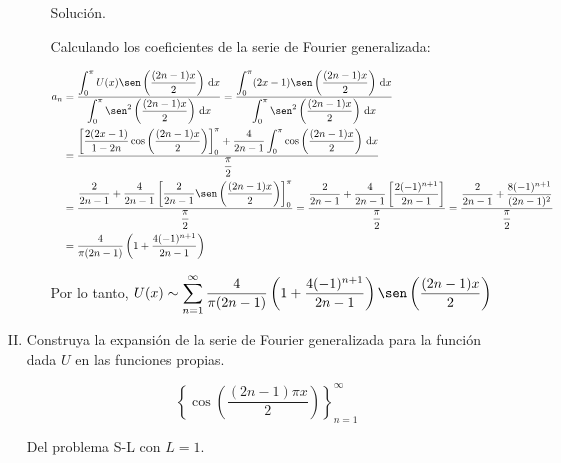 \documentclass[fleqn]{article}
\newcommand{\integ}[3]{\displaystyle \int_{#1}^{#2} #3 \, \mathrm{d} x}
\begin{document}
\begin{enumerate}[I.]
\begin{enumerate}
			Solución.
			
			\normalfont

			Calculando los coeficientes de la serie de Fourier generalizada:

            \begin{align*}
                a_n &= \dfrac{\integ{0}{\pi}{U(x) \sen \left( \dfrac{(2n - 1) x}{2} \right)}}{\integ{0}{\pi}{\sen^2 \left( \dfrac{(2n - 1) x}{2} \right)}} 
				= \dfrac{\integ{0}{\pi}{(2x - 1) \sen \left( \dfrac{(2n - 1) x}{2} \right)}}{\integ{0}{\pi}{\sen^2 \left( \dfrac{(2n - 1) x}{2} \right)}} \\
                &= \dfrac{\left[ \dfrac{2(2x - 1)}{1 - 2n} \cos \left( \dfrac{(2n - 1) x}{2} \right) \right]_{0}^{\pi} + \dfrac{4}{2n - 1} \integ{0}{\pi}{\cos \left( \dfrac{(2n - 1) x}{2} \right)}}{\dfrac{\pi}{2}} \\
                &= \dfrac{\dfrac{2}{2n - 1} + \dfrac{4}{2n - 1} \left[ \dfrac{2}{2n - 1} \sen \left( \dfrac{(2n - 1) x}{2} \right) \right]_{0}^{\pi}}{\dfrac{\pi}{2}} 
                = \dfrac{\dfrac{2}{2n - 1} + \dfrac{4}{2n - 1} \left[ \dfrac{2(-1)^{n+1}}{2n - 1} \right]}{\dfrac{\pi}{2}} 
                = \dfrac{\dfrac{2}{2n - 1} + \dfrac{8(-1)^{n+1}}{(2n - 1)^2}}{\dfrac{\pi}{2}} \\
                &= \dfrac{4}{\pi (2n - 1)} \left( 1 + \dfrac{4(-1)^{n+1}}{2n - 1} \right)
            \end{align*}

            Por lo tanto, $ U(x) \sim \displaystyle \sum_{n=1}^{\infty} \dfrac{4}{\pi (2n - 1)} \left( 1 + \dfrac{4(-1)^{n+1}}{2n - 1} \right) \sen \left( \dfrac{(2n - 1) x}{2} \right) $
		\end{enumerate} \vspace{3mm}


		\bfseries
			
		\item Construya la expansión de la serie de Fourier generalizada para la función dada $U$ en las funciones propias.
		
		\begin{equation*}
			\left\lbrace \cos \left( \dfrac{(2n - 1) \pi x}{2} \right) \right\rbrace_{n=1}^{\infty}
		\end{equation*}

		Del problema S-L con $ L = 1 $.
		

\end{enumerate}
\end{document}
